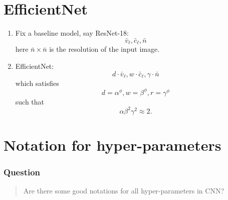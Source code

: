 \section{EfficientNet}
\begin{enumerate}
\item Fix a baseline model, say ResNet-18:  
$$
\bar v_\ell, \bar c_\ell, \bar n
$$
here $\bar n\times\bar n$ is the resolution of the input image. 
\item EfficientNet:
$$
d\cdot\bar v_\ell, w\cdot \bar c_\ell, \gamma\cdot\bar n
$$
which satisfies
$$
d=\alpha^\phi, w=\beta^\phi, r=\gamma^\phi
$$
such that
$$
\alpha\beta^2\gamma^2\approx 2.
$$
\end{enumerate}

\section{Notation for hyper-parameters}

\subsubsection*{Question}
\begin{quote}
  Are there some good notations for all hyper-parameters in CNN?
\end{quote}



